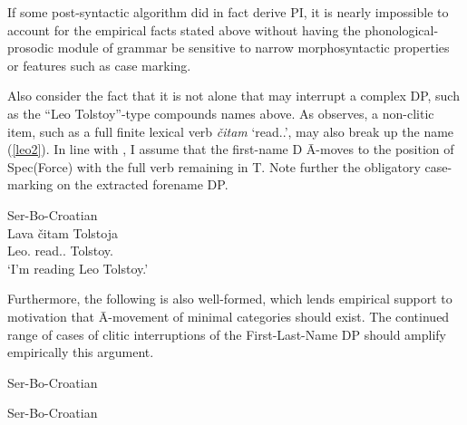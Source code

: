 \documentclass[output=paper]{langsci/langscibook}
\begin{document}
If some post-syntactic algorithm did in fact derive \gls{PI}, it is nearly
impossible to account for the empirical facts stated above without having the
phonological-prosodic module of grammar be sensitive to narrow morphosyntactic
properties or features such as case marking.

Also consider the fact that it is not  alone that may interrupt a
complex DP, such as the \enquote{Leo Tolstoy}-type compounds names above. As
\citet{Boskovic:2009b} observes, a non-clitic item, such as a full finite
lexical verb \emph{čitam} `read.\Fsg.\Prs{}', may also break up the name
(\ref{leo2}). In line with \citet{roberts:2012uq}, I assume that the first-name
D Ā-moves to the position of Spec(Force) with the full verb
remaining in T. Note further the obligatory case-marking on the
extracted forename DP.

\begin{exe}
    \ex Ser-Bo-Croatian\\
    \gll Lava čitam Tolstoja \\
    Leo.\Acc{} read.\Fsg.\Prs{} Tolstoy.\Acc{} \\
    \trans `I'm reading Leo Tolstoy.'
\label{leo2}
\end{exe}

Furthermore, the following is also well-formed, which lends empirical support
to  motivation that Ā-movement of minimal categories
should exist. The continued range of cases of clitic interruptions of the
First-Last-Name DP should amplify empirically this argument.

\begin{exe}
    \ex Ser-Bo-Croatian
\begin{xlista}
\end{xlista}
\label{6}
\ex Ser-Bo-Croatian
\begin{xlista}
\end{xlista}

\end{exe}
\end{document}

